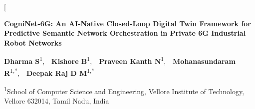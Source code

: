 \documentclass[twocolumn,10pt,twoside]{article}
\begin{document}
\balance

\twocolumn[{
  \begin{center}
  \vspace*{-0.5em}
  {\LARGE\textbf{\sffamily CogniNet-6G: An AI-Native Closed-Loop Digital Twin Framework for Predictive Semantic Network Orchestration in Private 6G Industrial Robot Networks}\par}
  \vspace{1.0em}
  {\large\sffamily \textbf{Dharma S}\textsuperscript{1},\ \ \textbf{Kishore B}\textsuperscript{1},\ \ \textbf{Praveen Kanth N}\textsuperscript{1},\ \ \textbf{Mohanasundaram R}\textsuperscript{1,*},\ \ \textbf{Deepak Raj D M}\textsuperscript{1,*}\par}
  \vspace{0.5em}
  {\small\sffamily \textsuperscript{1}School of Computer Science and Engineering, Vellore Institute of Technology, Vellore 632014, Tamil Nadu, India\par}
  \vspace{1.2em}
  \end{center}

}
\end{document}
